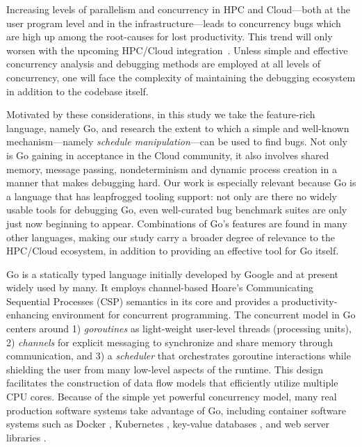 
Increasing levels of parallelism and concurrency in HPC and Cloud---both
at the user program level and in the infrastructure---leads to concurrency
bugs which are high up among the root-causes for lost productivity.
%
This trend will only worsen with the upcoming HPC/Cloud
integration~\cite{dan-herbein-dong}.
%
%
Unless simple and effective concurrency analysis and
debugging methods are employed at all levels of
concurrency, one will face the complexity of maintaining
the debugging ecosystem in addition to the codebase itself.


Motivated by these considerations,
in this study we take the feature-rich language, namely Go,
and research the extent to which a simple and well-known
mechanism---namely {\em schedule manipulation}---can be used
to find bugs.
%
Not only is Go gaining in acceptance in the Cloud community,
it also involves shared memory, message passing, nondeterminism
and dynamic process creation in a manner that makes debugging hard.
%
Our work is especially relevant
because Go is a language that has leapfrogged tooling support: not only
are there no widely usable tools for debugging Go, even well-curated
bug benchmark suites are only just now beginning to appear.
%
%
Combinations of Go's features are found in many other languages,
making our study carry a broader degree of relevance
to the HPC/Cloud ecosystem, in addition to providing an effective
tool for Go itself.



Go \cite{go} is a statically typed language initially developed by Google and at present widely used by many.
%
It employs channel-based Hoare's Communicating Sequential Processes (CSP) \cite{hoare-csp78} semantics in its core and provides a productivity-enhancing environment for concurrent programming.
%
The concurrent model in Go centers around
1) \textit{goroutines} as light-weight user-level threads (processing units),
2) \textit{channels} for explicit messaging to synchronize and share memory through communication, and
3) a \textit{scheduler} that orchestrates goroutine interactions while shielding
the user from
many low-level
aspects of the runtime.
%
This design
facilitates the
construction
of data flow models that efficiently utilize multiple CPU cores.
%
Because of the simple yet powerful concurrency model, many real production software systems take advantage of Go,
including
container software systems such as Docker \cite{merkel2014docker}, Kubernetes \cite{kubernetes},  key-value databases \cite{etcd}, and web server libraries \cite{grpc}.
%


